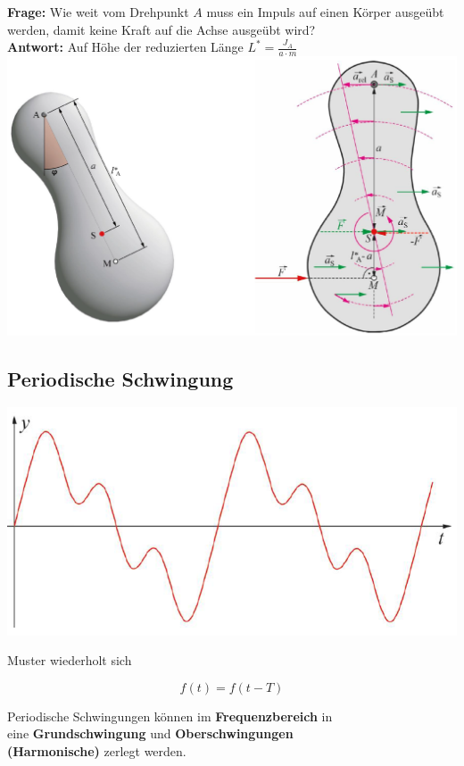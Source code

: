\textbf{Frage:} Wie weit vom Drehpunkt $A$ muss ein Impuls auf einen Körper ausgeübt werden, damit keine Kraft auf die Achse ausgeübt wird? \\

\textbf{Antwort:} Auf Höhe der reduzierten Länge $L^* = \frac{J_A}{a \cdot m}$ \\
\includegraphics[width=0.8\linewidth]{Bilder/Wellen-Optik/perkussionszentrum} \\




\subsection{Periodische Schwingung}

\begin{minipage}{0.48\linewidth}
\includegraphics[width=0.8\linewidth]{Bilder/Wellen-Optik/periodische_schwingung} 
\end{minipage}
\hfill
\begin{minipage}{0.48\linewidth}

Muster wiederholt sich 

$$ \boxed{ f(t) = f(t - T ) }$$
\end{minipage}


Periodische Schwingungen können im \textbf{Frequenzbereich} in \\
eine \textbf{Grundschwingung} und \textbf{Oberschwingungen}\\
\textbf{(Harmonische)} zerlegt werden. 

